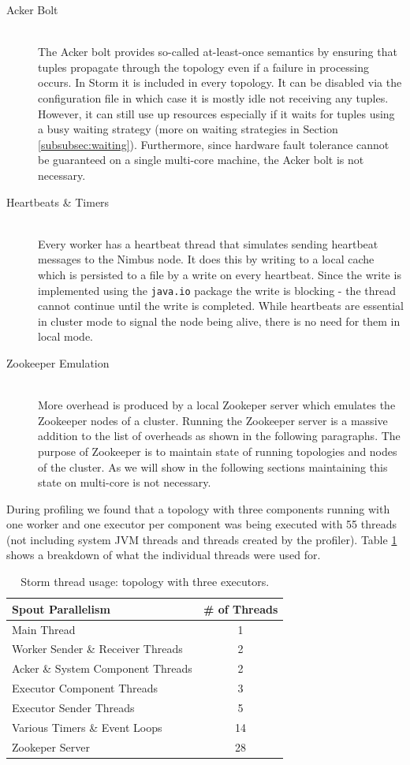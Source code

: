 \begin{description}
	\item[Acker Bolt] \hfill \\
	The Acker bolt provides so-called at-least-once semantics by ensuring that tuples propagate through the topology even if a failure in processing occurs. In Storm it is included in every topology. It can be disabled via the configuration file in which case it is mostly idle not receiving any tuples. However, it can still use up resources especially if it waits for tuples using a busy waiting strategy (more on waiting strategies in Section \ref{subsubsec:waiting}). Furthermore, since hardware fault tolerance cannot be guaranteed on a single multi-core machine, the Acker bolt is not necessary.
	\item[Heartbeats \& Timers] \hfill \\
	Every worker has a heartbeat thread that simulates sending heartbeat messages to the Nimbus node. It does this by writing to a local cache which is persisted to a file by a write on every heartbeat. Since the write is implemented using the \texttt{java.io} package the write is blocking - the thread cannot continue until the write is completed. While heartbeats are essential in cluster mode to signal the node being alive, there is no need for them in local mode.
	\item[Zookeeper Emulation] \hfill \\
	More overhead is produced by a local Zookeper server which emulates the Zookeeper nodes of a cluster. Running the Zookeeper server is a massive addition to the list of overheads as shown in the following paragraphs. The purpose of Zookeeper is to maintain state of running topologies and nodes of the cluster. As we will show in the following sections maintaining this state on multi-core is not necessary.
\end{description}

During profiling we found that a topology with three components running with one worker and one executor per component was being executed with 55 threads (not including system JVM threads and threads created by the profiler). Table \ref{table:breakdown} shows a breakdown of what the individual threads were used for.

\begin{table}[htb!]
\centering
\small
\begin{tabular}{@{}lc@{}}
    \textbf{Spout Parallelism} & \textbf{\# of Threads} \\ \toprule
    Main Thread & 1  \\
	Worker Sender \& Receiver Threads & 2  \\
    Acker \& System Component Threads & 2  \\
    Executor Component Threads & 3  \\
    Executor Sender Threads & 5  \\
    Various Timers \& Event Loops & 14  \\
    Zookeper Server & 28  \\
\end{tabular}
\caption[Storm thread usage.]{Storm thread usage: topology with three executors.}
\label{table:breakdown}
\end{table}

